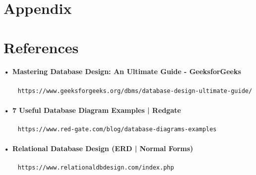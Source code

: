 \documentclass[12pt,a4paper]{report}
\begin{document}
\section{Appendix} 

\begingroup
\titleformat{\chapter}[display]{\normalfont\huge\bfseries}{\chaptertitlename\ \thechapter}{20pt}{\Huge}

\renewcommand{\clearpage}{} 
\renewcommand{\cftloftitlefont}{\normalsize\bfseries}
\listoffigures
\renewcommand{\cftlottitlefont}{\normalsize\bfseries} 
\listoftables
\endgroup

\newpage
\section{References}

\paragraph{• Mastering Database Design: An Ultimate Guide - GeeksforGeeks}
\begin{verbatim}
	https://www.geeksforgeeks.org/dbms/database-design-ultimate-guide/
\end{verbatim}
 \paragraph{• 7 Useful Database Diagram Examples | Redgate}

\begin{verbatim}
	https://www.red-gate.com/blog/database-diagrams-examples
\end{verbatim}

\paragraph{• Relational Database Design (ERD | Normal Forms)}

\begin{verbatim}
	https://www.relationaldbdesign.com/index.php
\end{verbatim}
\end{document}
